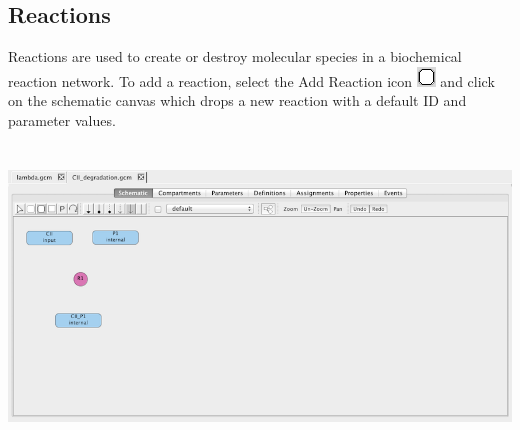 \documentclass[titlepage,11pt]{article}
\begin{document}
\subsection{\label{Reactions}Reactions}

\noindent
Reactions are used to create or destroy molecular species in a biochemical reaction network.  
To add a reaction, select the Add Reaction icon \includegraphics{../gui/icons/modelview/add_reaction_selected} and click on the schematic canvas which drops a new reaction with a default ID and parameter values.  

\begin{center}
\includegraphics[height=80mm]{screenshots/reaction}
\end{center}
\end{document}
